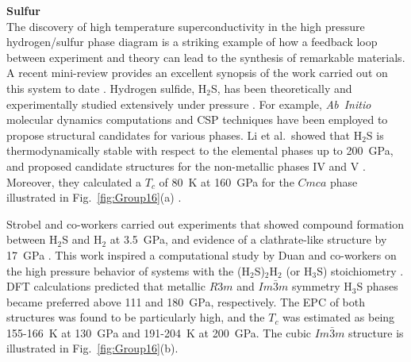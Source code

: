 \documentclass[12pt,letterpaper,oneside]{article}
\begin{document}
\noindent\textbf{Sulfur} \\ 
%
The discovery of high temperature superconductivity in the high pressure hydrogen/sulfur phase diagram is a striking example of how a feedback loop between experiment and theory can lead to the synthesis of remarkable materials. A recent mini-review provides an excellent synopsis of the work carried out on this system to date \cite{Yao-S-review:2018}. Hydrogen sulfide, H$_2$S, has been theoretically and experimentally studied extensively under pressure \cite{Shimizu:1992,Endo:1994,Shimizu:1995,Loveday:1997,Fujihisa:1998,Endo:1998,Endo:1996,Shimizu:1997,Sakashita:1997, Rousseau:1999, Sasaki:1991,Rousseau:2000a,Wang:2007-S,Wang:2010-S,Li:2014,Durajski:2015-S}. For example, \emph{Ab~Initio} molecular dynamics computations \cite{Rousseau:2000a,Wang:2007-S,Wang:2010-S} and CSP techniques \cite{Li:2014} have been employed to propose structural candidates for various phases. Li et al.\ showed that H$_2$S is thermodynamically stable with respect to the elemental phases up to 200~GPa, and proposed candidate structures for the non-metallic phases IV and V \cite{Li:2014}. Moreover, they calculated a $T_c$ of 80~K at 160~GPa for the $Cmca$ phase illustrated in Fig.\ \ref{fig:Group16}(a) \cite{Li:2014}. 


Strobel and co-workers carried out experiments that showed compound formation between H$_2$S and H$_2$ at 3.5~GPa, and evidence of a clathrate-like structure by 17~GPa \cite{Strobel:2011a}.  This work inspired a computational study by Duan and co-workers on the high pressure behavior of systems with the (H$_2$S)$_2$H$_2$ (or H$_3$S) stoichiometry \cite{Duan:2014}. DFT calculations predicted that metallic $R3m$ and $Im\bar{3}m$ symmetry H$_3$S phases became preferred above 111 and 180~GPa, respectively. The EPC of both structures was found to be particularly high, and the $T_c$ was estimated as being 155-166~K at 130~GPa and 191-204~K at 200~GPa. The cubic $Im\bar{3}m$ structure is illustrated in Fig.\ \ref{fig:Group16}(b).
\end{document}
